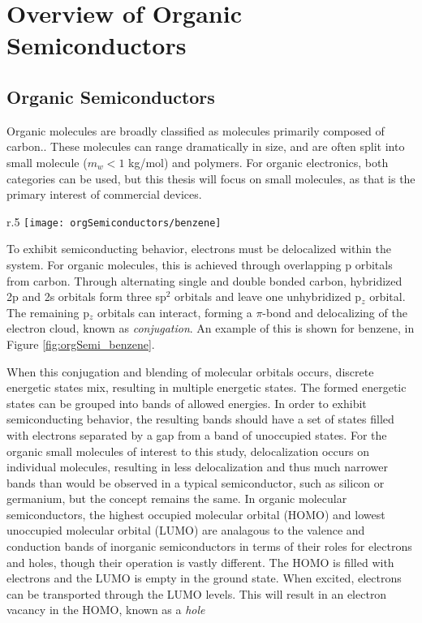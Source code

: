 \documentclass[../thesis.tex]{subfiles}
\begin{document}
\chapter{Overview of Organic Semiconductors}\label{sec:orgSemi}

\section{Organic Semiconductors}

Organic molecules are broadly classified as molecules primarily composed of carbon.\supercite{Pope1999}.
These molecules can range dramatically in size, and are often split into small molecule ($m_w<1$ kg/mol) and polymers.
For organic electronics, both categories can be used, but this thesis will focus on small molecules, as that is the primary interest of commercial devices.

\begin{wrapfigure}{r}{.5\textwidth}
\centering
\texttt{[image: orgSemiconductors/benzene]}
\caption{Molecular orbitals of benzene.  The left figure shows the 6 out of plain p$_z$ orbitals, and the right image shows the delocalized $\pi$-bond.\supercite{benzene}}
\label{fig:orgSemi_benzene}
\end{wrapfigure}

To exhibit semiconducting behavior, electrons must be delocalized within the system.\supercite{Neamen1992}
For organic molecules, this is achieved through overlapping p orbitals from carbon.  
Through alternating single and double bonded carbon, hybridized 2p and 2s orbitals form three sp$^2$ orbitals and leave one unhybridized p$_z$ orbital.
The remaining p$_z$ orbitals can interact, forming a $\pi$-bond and delocalizing of the electron cloud, known as \textit{conjugation}.
An example of this is shown for benzene, in Figure \ref{fig:orgSemi_benzene}.

When this conjugation and blending of molecular orbitals occurs, discrete energetic states mix, resulting in multiple energetic states.\supercite{Kittel2005,Wallis2000}
The formed energetic states can be grouped into bands of allowed energies.
In order to exhibit semiconducting behavior, the resulting bands should have a set of states filled with electrons separated by a gap from a band of unoccupied states.
For the organic small molecules of interest to this study, delocalization occurs on individual molecules, resulting in less delocalization and thus much narrower bands than would be observed in a typical semiconductor, such as silicon or germanium, but the concept remains the same.
In organic molecular semiconductors, the highest occupied molecular orbital (HOMO) and lowest unoccupied molecular orbital (LUMO) are analagous to the valence and conduction bands of inorganic semiconductors in terms of their roles for electrons and holes, though their operation is vastly different.
The HOMO is filled with electrons and the LUMO is empty in the ground state.
When excited, electrons can be transported through the LUMO levels.
This will result in an electron vacancy in the HOMO, known as a \textit{hole}
\end{document}

